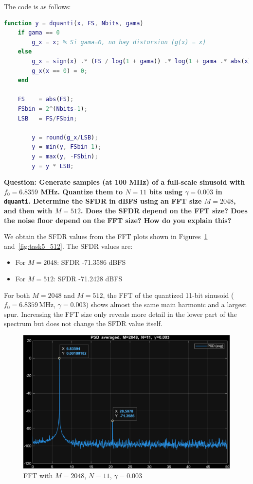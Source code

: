 The code is as follows:
\begin{lstlisting}[language=Matlab]
    function y = dquanti(x, FS, Nbits, gama)
    if gama == 0
        g_x = x; % Si gama=0, no hay distorsion (g(x) = x)
    else
        g_x = sign(x) .* (FS / log(1 + gama)) .* log(1 + gama .* abs(x) / FS);
        g_x(x == 0) = 0;
    end

    FS    = abs(FS);
    FSbin = 2^(Nbits-1);
    LSB   = FS/FSbin;  

        y = round(g_x/LSB); 
        y = min(y, FSbin-1); 
        y = max(y, -FSbin); 
        y = y * LSB;
\end{lstlisting}

\vspace{1cm}
\textbf{Question: Generate  samples (at 100 MHz) of a full-scale sinusoid with $f_0 = 6.8359$ MHz.
Quantize them to $N=11$ bits using $\gamma = 0.003$ in {\tt dquanti}. 
Determine the SFDR in dBFS using an FFT size $M=2048$, and then with $M=512$. 
Does the SFDR depend on the FFT size? Does the noise floor depend on the FFT size? How do you explain this?
}
\vspace{0.5cm}

We obtain the SFDR values from the FFT plots shown in Figures~\ref{fig:task5_2048} and~\ref{fig:task5_512}.
The SFDR values are:
\begin{itemize}
    \item For \(M=2048\): SFDR -71.3586 dBFS
    \item For \(M=512\): SFDR -71.2428 dBFS
\end{itemize}

For both $M=2048$ and $M=512$, the FFT of the quantized 11-bit sinusoid ($f_0=6.8359$\,MHz, $\gamma=0.003$) shows almost the same main harmonic and a largest spur.
Increasing the FFT size only reveals more detail in the lower part of the spectrum but does not change the SFDR value itself.

\begin{figure}[H]
    \centering
    \includegraphics[width=1\textwidth]{img/task5_2048.png}
    \caption{FFT with $M=2048$, $N=11$, $\gamma=0.003$}
    \label{fig:task5_2048}
\end{figure}

